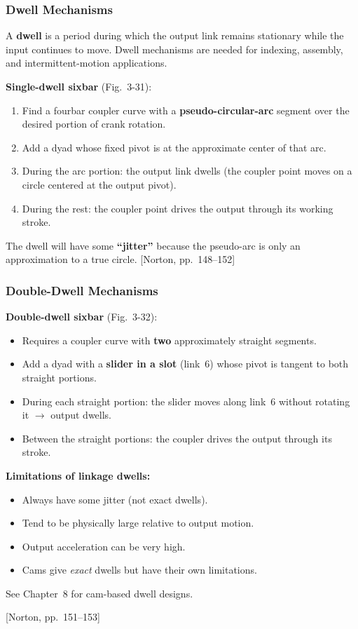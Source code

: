\documentclass[10pt,aspectratio=43]{beamer}
\newcommand{\pref}[1]{\vfill\hfill{\scriptsize\color{gray}[Norton, pp.~#1]}}
\begin{document}
\begin{frame}
\frametitle{Dwell Mechanisms}

\begin{yellowbox}
A \textbf{dwell} is a period during which the output link remains stationary while the input continues to move. Dwell mechanisms are needed for indexing, assembly, and intermittent-motion applications.
\end{yellowbox}

\vspace{6pt}
\textbf{Single-dwell sixbar} (Fig.~3-31):
\begin{enumerate}
  \item Find a fourbar coupler curve with a \textbf{pseudo-circular-arc} segment over the desired portion of crank rotation.
  \item Add a dyad whose fixed pivot is at the approximate center of that arc.
  \item During the arc portion: the output link dwells (the coupler point moves on a circle centered at the output pivot).
  \item During the rest: the coupler point drives the output through its working stroke.
\end{enumerate}

\vspace{4pt}
The dwell will have some \textbf{``jitter''} because the pseudo-arc is only an approximation to a true circle.
\pref{148--152}
\end{frame}

\begin{frame}
\frametitle{Double-Dwell Mechanisms}

\textbf{Double-dwell sixbar} (Fig.~3-32):
\begin{itemize}
  \item Requires a coupler curve with \textbf{two} approximately straight segments.
  \item Add a dyad with a \textbf{slider in a slot} (link~6) whose pivot is tangent to both straight portions.
  \item During each straight portion: the slider moves along link~6 without rotating it $\to$ output dwells.
  \item Between the straight portions: the coupler drives the output through its stroke.
\end{itemize}

\vspace{6pt}
\begin{redbox}
\textbf{Limitations of linkage dwells:}
\begin{itemize}
  \item Always have some jitter (not exact dwells).
  \item Tend to be physically large relative to output motion.
  \item Output acceleration can be very high.
  \item Cams give \emph{exact} dwells but have their own limitations.
\end{itemize}
See Chapter~8 for cam-based dwell designs.
\end{redbox}
\pref{151--153}
\end{frame}
\end{document}
